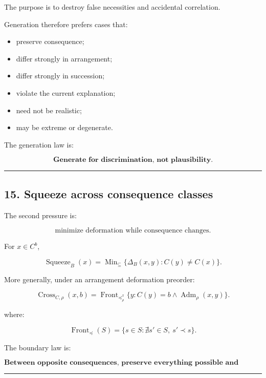 \documentclass[
]{article}
\providecommand{\tightlist}{%
  \setlength{\itemsep}{0pt}\setlength{\parskip}{0pt}}
\begin{document}
The purpose is to destroy false necessities and accidental correlation.

Generation therefore prefers cases that:

\begin{itemize}
\tightlist
\item
  preserve consequence;
\item
  differ strongly in arrangement;
\item
  differ strongly in succession;
\item
  violate the current explanation;
\item
  need not be realistic;
\item
  may be extreme or degenerate.
\end{itemize}

The generation law is:

\[
\boxed{
\textbf{Generate for discrimination, not plausibility.}
}
\]

\begin{center}\rule{0.5\linewidth}{0.5pt}\end{center}

\subsection{15. Squeeze across consequence
classes}\label{squeeze-across-consequence-classes}

The second pressure is:

\[
\boxed{
\text{minimize deformation while consequence changes.}
}
\]

For \(x\in C^b\),

\[
\boxed{
\operatorname{Squeeze}_B(x)
=
\operatorname{Min}_{\subseteq}
\{
\Delta_B(x,y):
C(y)\neq C(x)
\}.
}
\]

More generally, under an arrangement deformation preorder:

\[
\boxed{
\operatorname{Cross}_{C,\rho}(x,b)
=
\operatorname{Front}_{\preceq_\rho^x}
\{
y:
C(y)=b
\land
\operatorname{Adm}_\rho(x,y)
\}.
}
\]

where:

\[
\operatorname{Front}_{\preceq}(S)
=
\{s\in S:\nexists s'\in S,\ s'\prec s\}.
\]

The boundary law is:

\[
\boxed{
\textbf{Between opposite consequences, preserve everything possible
and minimize the change that flips the consequence.}
}
\]

\begin{center}\rule{0.5\linewidth}{0.5pt}\end{center}
\end{document}
